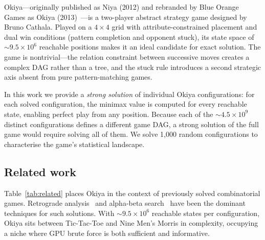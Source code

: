 \documentclass[11pt,a4paper]{article}
\begin{document}
Okiya---originally published as Niya (2012) and rebranded by Blue Orange
Games as Okiya (2013)~\cite{cathala2013}---is a two-player abstract strategy
game designed by Bruno Cathala.  Played on a $4{\times}4$ grid with
attribute-constrained placement and dual win conditions (pattern completion
and opponent stuck), its state space of ${\sim}9.5{\times}10^{6}$ reachable
positions makes it an ideal candidate for exact solution.  The game is
nontrivial---the relation constraint between successive moves creates a
complex DAG rather than a tree, and the stuck rule introduces a second
strategic axis absent from pure pattern-matching games.

In this work we provide a \emph{strong solution} of individual Okiya
configurations: for each solved configuration, the minimax value is computed
for every reachable state, enabling perfect play from any position.  Because
each of the ${\sim}4.5 \times 10^{9}$ distinct configurations defines a
different game DAG, a strong solution of the full game would require solving
all of them.  We solve 1{,}000 random configurations to characterise the
game's statistical landscape.

\subsection{Related work}

Table~\ref{tab:related} places Okiya in the context of previously solved
combinatorial games.  Retrograde analysis~\cite{thompson1986} and
alpha-beta search~\cite{knuth1975} have been the dominant techniques for
such solutions.  With ${\sim}9.5{\times}10^{6}$ reachable states per
configuration, Okiya sits between Tic-Tac-Toe and Nine Men's Morris in
complexity, occupying a niche where GPU brute force is both sufficient and
informative.
\end{document}
